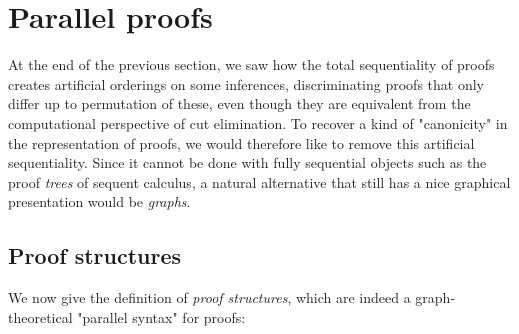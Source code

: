 \documentclass[12pt]{report}
\begin{document}
\chapter{Parallel proofs}
\label{sec:parallel-proofs}

At the end of the previous section, we saw how the total sequentiality of proofs creates artificial
orderings on some inferences, discriminating proofs that only differ up to permutation of these,
even though they are equivalent from the computational perspective of cut elimination. To recover a
kind of "canonicity" in the representation of proofs, we would therefore like to remove this
artificial sequentiality. Since it cannot be done with fully sequential objects such as the proof
\emph{trees} of sequent calculus, a natural alternative that still has a nice graphical presentation
would be \emph{graphs}.

\section{Proof structures}

We now give the definition of \emph{proof structures}, which are indeed a
graph-theoretical "parallel syntax" for proofs:
\end{document}
